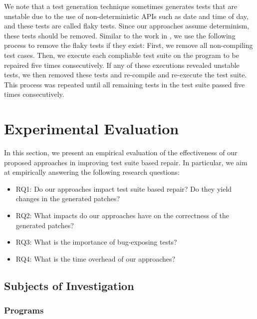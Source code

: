 \documentclass[]{sig-alternate}
\begin{document}
We note that a test generation technique sometimes generates tests that are unstable due to the use of non-deterministic APIs such as date and time of day, and these tests are called flaky tests. Since our approaches assume determinism, these tests should be removed. Similar to the work in \cite{JustJIEHF2014,7372009}, we use the following process to remove the flaky tests if they exist: First, we remove all non-compiling test cases. Then, we execute each compliable test suite on the program to be repaired five times consecutively. If any of these executions revealed unstable tests, we then removed these tests and re-compile and re-execute the test suite. This process was repeated until all remaining tests in the test suite passed five times consecutively.



\section{Experimental Evaluation}
\label{sec:evaluation}


In this section, we present an empirical evaluation of the effectiveness of our proposed approaches in improving test suite based repair. 
In particular, we aim at empirically answering
the following research questions:

\begin{itemize}
\item RQ1: Do our approaches impact test suite based repair? Do they yield changes in the generated patches?

\item RQ2: What impacts do our approaches have on the correctness of the generated patches?

\item RQ3: What is the importance of bug-exposing tests?

\item RQ4: What is the time overhead of our approaches?

\end{itemize}


\subsection{Subjects of Investigation}

\subsubsection{Programs}
\end{document}
